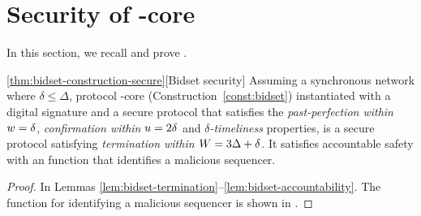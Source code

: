 \section{Security of \bidsettm-core}\label{app:bidsetsec}



In this section, we recall and prove .

\begin{customthm}{\ref{thm:bidset-construction-secure}}[Bidset security]
    Assuming a synchronous network where $\delta \leq \Delta$,
    protocol \bidsettm-core (Construction~\ref{const:bidset}) instantiated with a digital signature and a secure \podtm protocol that satisfies the \emph{past-perfection within $w = \delta$}, \emph{confirmation within $u=2\delta$} and \emph{$\delta$-timeliness} properties, is a secure \bidsettm protocol satisfying \emph{termination within $W = 3\Delta + \delta$}.
    It satisfies accountable safety with an \identifySequencer{} function that identifies a malicious sequencer.
\end{customthm}
\begin{proof}
	In Lemmas \ref{lem:bidset-termination}--\ref{lem:bidset-accountability}. The function for identifying a malicious sequencer is shown in .
\end{proof}

